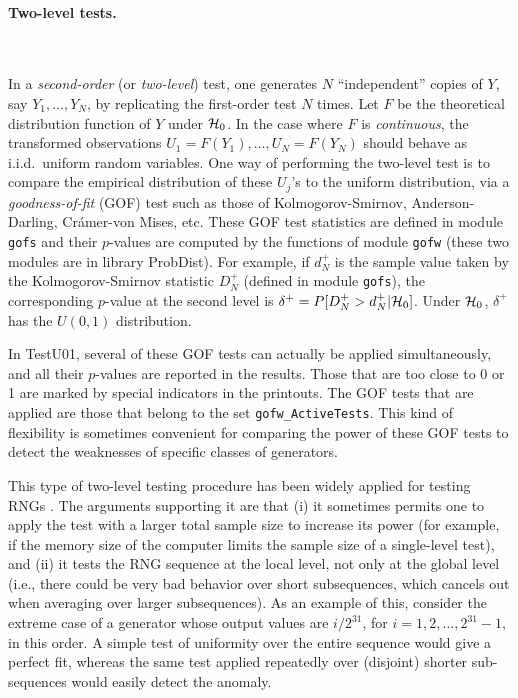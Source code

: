 \paragraph*{Two-level tests.} \

In a {\em second-order\/} (or {\em two-level\/}) test, one generates
$N$ ``independent'' copies of $Y$, say $Y_1,\dots,Y_N$, by replicating
the first-order test $N$ times.
Let $F$ be the theoretical distribution function of $Y$ under $\mathcal{H}_0$.
In the case where $F$ is {\em continuous}, the transformed observations
$U_1 = F(Y_1),\dots, U_N = F(Y_N)$ should behave as i.i.d.\ uniform
random variables. 
One way of performing the two-level test is to compare the empirical 
distribution of these $U_j$'s to the uniform
distribution, via a {\em goodness-of-fit\/} (GOF) test such as 
those of Kolmogorov-Smirnov, Anderson-Darling, Cr\'amer-von Mises, etc.
These GOF test statistics are defined in module {\tt gofs} and their 
$p$-values are computed by the functions of module {\tt gofw}
(these two modules are in library ProbDist).
For example, if $d_N^+$ is the sample value taken by the Kolmogorov-Smirnov
statistic $D_N^+$ (defined in module {\tt gofs}), the corresponding 
$p$-value at the second level is $\delta^+ = P[D_N^+ > d_N^+ | \mathcal{H}_0]$.
Under $\mathcal{H}_0$, $\delta^+$ has the $U(0,1)$ distribution.

In TestU01, several of these GOF tests can actually be applied 
simultaneously, and all their $p$-values are reported in the results.
Those that are too close to 0 or 1 are marked by special indicators
in the printouts.  %
The GOF tests that are applied are those that belong to the set
{\tt gofw\_ActiveTests}.
This kind of flexibility is sometimes convenient for comparing the
power of these GOF tests to detect the weaknesses of specific classes
of generators.

This type of two-level testing procedure has been widely applied for 
testing RNGs \cite{sFIS96a,rKNU98a,rLEC92a,rLEE97a,rMAR85a}.
The arguments supporting it are that 
(i) it sometimes permits one to apply the test with a larger total 
sample size to increase its power 
(for example, if the memory size of the computer 
limits the sample size of a single-level test), and
(ii) it tests the RNG sequence at the local level, 
not only at the global level (i.e., there could be very bad behavior 
over short subsequences, which cancels out when averaging 
over larger subsequences).
As an example of this, consider the extreme case of a generator
whose output values are $i/2^{31}$, for $i=1,2,\dots,2^{31}-1$,
in this order. 
A simple test of uniformity over the entire sequence would give
a perfect fit, whereas the same test applied repeatedly over 
(disjoint) shorter sub-sequences would easily detect the anomaly.

